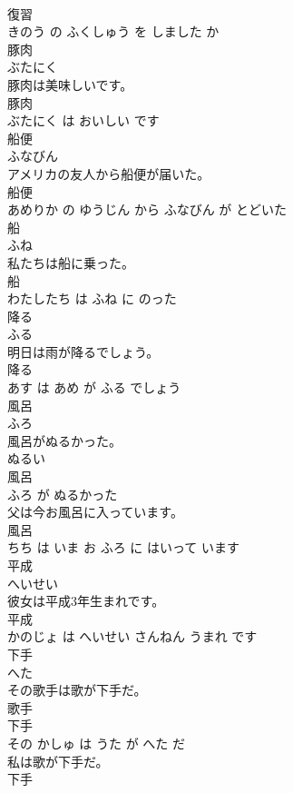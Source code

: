 \documentclass[8pt]{extreport}
\begin{document}
\begin{CJK}{UTF8}{min}
\\	復習 
\\	きのう の ふくしゅう を しました か			
\\	豚肉	
\\	ぶたにく			
\\	豚肉は美味しいです。	
\\	豚肉 
\\	ぶたにく は おいしい です			
\\	船便	
\\	ふなびん			
\\	アメリカの友人から船便が届いた。	
\\	船便 
\\	あめりか の ゆうじん から ふなびん が とどいた			
\\	船	
\\	ふね			
\\	私たちは船に乗った。	
\\	船 
\\	わたしたち は ふね に のった			
\\	降る	
\\	ふる			
\\	明日は雨が降るでしょう。	
\\	降る 
\\	あす は あめ が ふる でしょう			
\\	風呂	
\\	ふろ			
\\	風呂がぬるかった。	
\\	ぬるい 
\\	風呂 
\\	ふろ が ぬるかった			
\\	父は今お風呂に入っています。	
\\	風呂 
\\	ちち は いま お ふろ に はいって います			
\\	平成	
\\	へいせい			
\\	彼女は平成3年生まれです。	
\\	平成 
\\	かのじょ は へいせい さんねん うまれ です			
\\	下手	
\\	へた			
\\	その歌手は歌が下手だ。	
\\	歌手 
\\	下手 
\\	その かしゅ は うた が へた だ			
\\	私は歌が下手だ。	
\\	下手 

\end{CJK}
\end{document}
